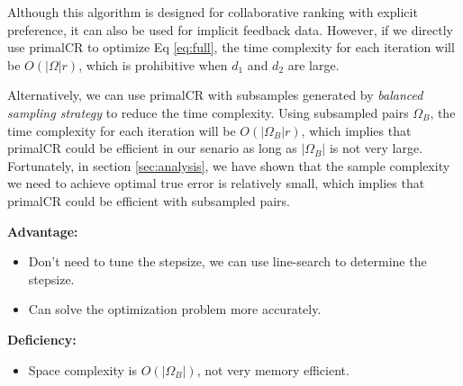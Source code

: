\documentclass[conference]{IEEEtran}
\numberwithin{equation}{section}
\newtheorem{sampling strategy}{Sampling Strategy}
\begin{document}
Although this algorithm is designed for collaborative ranking with explicit preference, it can also be used for implicit feedback data. However, if we directly use \textsf{primalCR} to optimize Eq \ref{eq:full}, the time complexity for each iteration will be $O(|\Omega|r)$, which is prohibitive when $d_1$ and $d_2$ are large.

Alternatively, we can use \textsf{primalCR} with subsamples generated by \emph{balanced sampling strategy} to reduce the time complexity. Using subsampled pairs $\Omega_B$, the time complexity for each iteration will be $O(|\Omega_B|r)$, which implies that \textsf{primalCR} could be efficient in our senario as long as $|\Omega_B|$ is not very large. Fortunately, in section \ref{sec:analysis}, we have shown that the sample complexity we need to achieve optimal true error is relatively small, which implies that \textsf{primalCR} could be efficient with subsampled pairs.

\textbf{Advantage: } 
\begin{itemize}
    \item Don't need to tune the stepsize, we can use line-search to determine the stepsize.
    \item Can solve the optimization problem more accurately.
\end{itemize}

\textbf{Deficiency:}
\begin{itemize}
    \item Space complexity is $O(|\Omega_B|)$, not very memory efficient.
\end{itemize}
\end{document}
